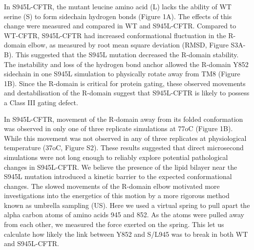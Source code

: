 In S945L-CFTR, the mutant leucine amino acid (L) lacks the ability of WT serine (S) to form sidechain hydrogen bonds (Figure 1A). The effects of this change were measured and compared in WT and S945L-CFTR. Compared to WT-CFTR, S945L-CFTR had increased conformational fluctuation in the R-domain elbow, as measured by root mean square deviation (RMSD, Figure S3A-B). This suggested that the S945L mutation decreased the R-domain stability. The instability and loss of the hydrogen bond anchor allowed the R-domain Y852 sidechain in one S945L simulation to physically rotate away from TM8 (Figure 1B). Since the R-domain is critical for protein gating, these observed movements and destabilisation of the R-domain suggest that S945L-CFTR is likely to possess a Class III gating defect.

In S945L-CFTR, movement of the R-domain away from its folded conformation was observed in only one of three replicate simulations at 77oC (Figure 1B). While this movement was not observed in any of three replicates at physiological temperature (37oC, Figure S2). These results suggested that direct microsecond simulations were not long enough to reliably explore potential pathological changes in S945L-CFTR. We believe the presence of the lipid bilayer near the S945L mutation introduced a kinetic barrier to the expected conformational changes. The slowed movements of the R-domain elbow motivated more investigations into the energetics of this motion by a more rigorous method known as umbrella sampling (US). Here we used a virtual spring to pull apart the alpha carbon atoms of amino acids 945 and 852. As the atoms were pulled away from each other, we measured the force exerted on the spring. This let us calculate how likely the link between Y852 and S/L945 was to break in both WT and S945L-CFTR.

